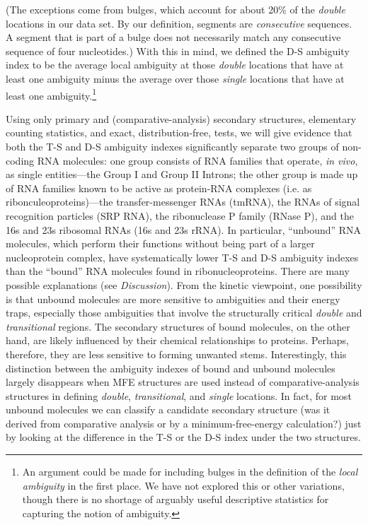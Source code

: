 \documentclass[10pt,letterpaper]{article}
\begin{document}
(The exceptions come from bulges, which account for about 20\% of the {\em double} locations in our data set.
By our definition, segments are {\em consecutive} sequences. A segment that is part of a bulge does not necessarily match any consecutive sequence of four nucleotides.)
With this in mind, we defined the D-S ambiguity index to be the average local ambiguity at those {\em double} locations that have at least one ambiguity minus the average over those {\em single} locations that have at least one ambiguity.\footnote{
An argument could be made for including bulges in the definition of the {\em local ambiguity} in the first place. We have not explored this or other variations, though there is no shortage of arguably useful descriptive statistics for capturing the notion of ambiguity.}

Using only primary and (comparative-analysis) secondary structures, elementary counting statistics, 
and exact, distribution-free, tests,
we will give evidence that
both the T-S and D-S ambiguity indexes 
significantly separate two groups of non-coding RNA molecules: one group consists of  RNA families that operate, {\em in vivo}, as single entities---the Group I and Group II Introns;
the other group is made up of RNA families  known to be active as protein-RNA complexes (i.e. as ribonculeoproteins)---the transfer-messenger RNAs (tmRNA), the RNAs of signal recognition particles (SRP RNA), the ribonuclease P family (RNase P), and the 16s and 23s ribosomal RNAs (16s and 23s rRNA). In particular, ``unbound'' RNA molecules, which perform their functions without being part of a larger nucleoprotein complex, have systematically lower T-S and D-S ambiguity indexes than the ``bound'' RNA molecules found in ribonucleoproteins. 
There are many possible explanations (see {\em Discussion}). From the kinetic viewpoint, one possibility is that unbound molecules are more sensitive to ambiguities and their energy traps, especially those ambiguities that involve the structurally critical {\em double} and {\em transitional} regions. The secondary structures of bound molecules, on the other hand, are likely influenced by their chemical relationships to proteins. Perhaps, therefore, they are less sensitive to forming unwanted stems. Interestingly, this distinction between the ambiguity indexes of bound and unbound molecules largely disappears when MFE structures are used instead of comparative-analysis structures in defining {\em double}, {\em transitional}, and {\em single} locations. In fact, for most unbound molecules we can classify a candidate secondary
structure (was it derived from comparative analysis or by a minimum-free-energy calculation?) just by looking at the difference in the T-S or the D-S index under the two structures.
\end{document}
